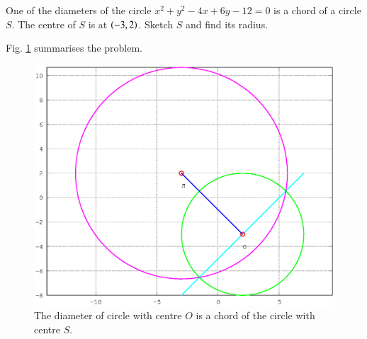 \documentclass[journal,12pt,twocolumn]{IEEEtran}
\begin{document}
%
\begin{problem}
One of the diameters of the  circle $x^2+y^2-4x+6y-12 = 0$ is a chord of a circle $S$. The centre of $S$ is at $\left(-3,2\right)$. Sketch $S$ and find its radius.
\end{problem}
\solution

Fig. \ref{fig_36} summarises the problem.

%
\begin{figure}[h]
\centering
\includegraphics[width=\columnwidth]{./version_2/ee16b1036/ee16b1036}
\caption{ The diameter of circle with centre $O$ is a chord of the circle with centre $S$.}
\label{fig_36}	
\end{figure}
%
\end{document}
